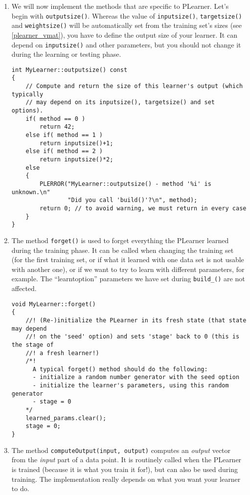 \documentclass[11pt]{book}
\begin{document}
\begin{enumerate}
\item We will now implement the methods that are specific to
PLearner. Let's begin with {\tt outputsize()}. Whereas the value
of {\tt inputsize()}, {\tt targetsize()} and {\tt weightsize()}
will be automatically set from the training set's sizes (see
\ref{plearner_vmat}), you have to define the output size of your
learner. It can depend on {\tt inputsize()} and other parameters, but
you should not change it during the learning or testing phase.
\begin{verbatim}
int MyLearner::outputsize() const
{
    // Compute and return the size of this learner's output (which typically
    // may depend on its inputsize(), targetsize() and set options).
    if( method == 0 )
        return 42;
    else if( method == 1 )
        return inputsize()+1;
    else if( method == 2 )
        return inputsize()*2;
    else
    {
        PLERROR("MyLearner::outputsize() - method '%i' is unknown.\n"
                "Did you call 'build()'?\n", method);
        return 0; // to avoid warning, we must return in every case
    }
}
\end{verbatim}

\item The method {\tt forget()} is used to forget everything the
PLearner learned during the training phase. It can be called when
changing the training set (for the first training set, or if what
it learned with one data set is not usable with another one), or if
we want to try to learn with different parameters, for example. The
“learntoption” parameters we have set during {\tt build\_()} are not
affected.
\begin{verbatim}
void MyLearner::forget()
{
    //! (Re-)initialize the PLearner in its fresh state (that state may depend
    //! on the 'seed' option) and sets 'stage' back to 0 (this is the stage of
    //! a fresh learner!)
    /*!
      A typical forget() method should do the following:
      - initialize a random number generator with the seed option
      - initialize the learner's parameters, using this random generator
      - stage = 0
    */
    learned_params.clear();
    stage = 0;
}
\end{verbatim}

\item The method {\tt computeOutput(input, output)} computes an {\em
output} vector from the {\em input} part of a data point. It is
routinely called when the PLearner is trained (because it is what you
train it for!), but can also be used during training. The implementation
really depends on what you want your learner to do.


\end{enumerate}
\end{document}
